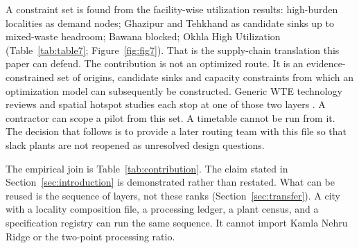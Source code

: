 \documentclass[12pt,a4paper]{article}
\begin{document}
A constraint set is found from the facility-wise utilization results: high-burden localities as demand nodes; Ghazipur and Tehkhand as candidate sinks up to mixed-waste headroom; Bawana blocked; Okhla High Utilization (Table~\ref{tab:table7}; Figure~\ref{fig:fig7}). That is the supply-chain translation this paper can defend. The contribution is not an optimized route. It is an evidence-constrained set of origins, candidate sinks and capacity constraints from which an optimization model can subsequently be constructed. Generic WTE technology reviews and spatial hotspot studies each stop at one of those two layers \citep{sciencedirect_wte_india_review_2014,ieam_kota_landuse_msw_2026}. A contractor can scope a pilot from this set. A timetable cannot be run from it. The decision that follows is to provide a later routing team with this file so that slack plants are not reopened as unresolved design questions.

The empirical join is Table~\ref{tab:contribution}. The claim stated in Section~\ref{sec:introduction} is demonstrated rather than restated. What can be reused is the sequence of layers, not these ranks (Section~\ref{sec:transfer}). A city with a locality composition file, a processing ledger, a plant census, and a specification registry can run the same sequence. It cannot import Kamla Nehru Ridge or the two-point processing ratio.
\end{document}
